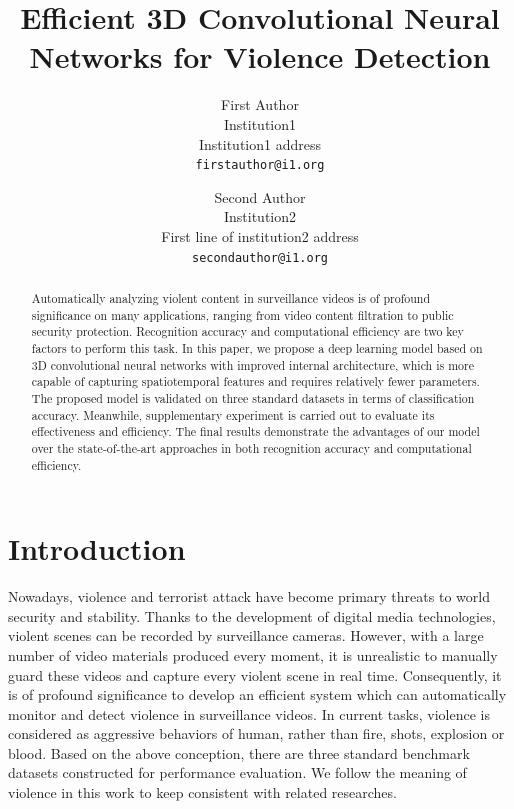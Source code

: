 \documentclass[10pt,twocolumn,letterpaper]{article}
\begin{document}
\title{Efficient 3D Convolutional Neural Networks for Violence Detection}

\author{First Author\\
Institution1\\
Institution1 address\\
{\tt\small firstauthor@i1.org}
\and
Second Author\\
Institution2\\
First line of institution2 address\\
{\tt\small secondauthor@i1.org}
}

\maketitle

\begin{abstract}
Automatically analyzing violent content in surveillance videos is of profound significance on many applications, ranging from video content filtration to public security protection. Recognition accuracy and computational efficiency are two key factors to perform this task. In this paper, we propose a deep learning model based on 3D convolutional neural networks with improved internal architecture, which is more capable of capturing spatiotemporal features and requires relatively fewer parameters. The proposed model is validated on three standard datasets in terms of classification accuracy. Meanwhile, supplementary experiment is carried out to evaluate its effectiveness and efficiency. The final results demonstrate the advantages of our model over the state-of-the-art approaches in both recognition accuracy and computational efficiency.
\end{abstract}

\section{Introduction}
\label{sec:1}

Nowadays, violence and terrorist attack have become primary threats to world security and stability.
Thanks to the development of digital media technologies, violent scenes can be recorded by surveillance cameras.
However, with a large number of video materials produced every moment, it is unrealistic to manually guard these videos and capture every violent scene in real time.
Consequently, it is of profound significance to develop an efficient system which can automatically monitor and detect violence in surveillance videos.
In current tasks, violence is considered as aggressive behaviors of human, rather than fire, shots, explosion or blood.
Based on the above conception, there are three standard benchmark datasets constructed for performance evaluation.
We follow the meaning of violence in this work to keep consistent with related researches.
\end{document}

